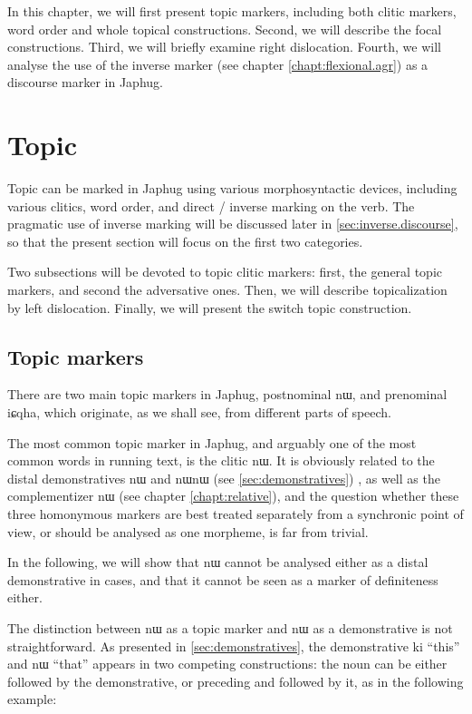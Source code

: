 \documentclass[oldfontcommands,oneside,a4paper,11pt]{memoir}
\newcommand{\ipa}[1]{{\phon #1}} %
\begin{document}
In this chapter, we will first present topic markers, including both clitic markers, word order and whole topical constructions. Second, we will describe the focal constructions. Third, we will briefly examine right dislocation. Fourth, we will analyse the use of the inverse marker (see chapter \ref{chapt:flexional.agr}) as a discourse marker in Japhug.

\section{Topic} \label{sec:topic}

Topic can be marked in Japhug using various morphosyntactic devices, including various clitics, word order, and direct / inverse marking on the verb. The pragmatic use of inverse marking will  be discussed later in \ref{sec:inverse.discourse}, so that the present section will focus on the first two categories. 

Two subsections will be devoted to topic clitic markers: first, the general topic markers, and second the adversative ones. Then, we will describe  topicalization by left dislocation. Finally, we will present the switch topic construction.

\subsection{Topic markers} 
There are two main topic markers in Japhug, postnominal \ipa{nɯ}, and prenominal \ipa{iɕqha}, which originate, as we shall see, from different parts of speech.

The most common topic marker in Japhug, and arguably one of the most common words in running text, is the clitic \ipa{nɯ}. It is obviously related to the distal demonstratives \ipa{nɯ} and \ipa{nɯnɯ} (see \ref{sec:demonstratives}) , as well as the complementizer \ipa{nɯ} (see chapter \ref{chapt:relative}), and the question whether these  three homonymous markers are best treated separately from a synchronic point of view, or should be analysed as one morpheme, is far from trivial. 

In the following, we will show that \ipa{nɯ} cannot be analysed either as a distal demonstrative in cases, and that it cannot be seen as a marker of definiteness either.

The distinction between \ipa{nɯ} as a topic marker and \ipa{nɯ} as a demonstrative is not straightforward. As presented in \ref{sec:demonstratives}, the demonstrative \ipa{ki} ``this'' and \ipa{nɯ} ``that'' appears in two competing constructions: the noun can be either followed by the demonstrative, or preceding and followed by it, as in the following example:
\end{document}
